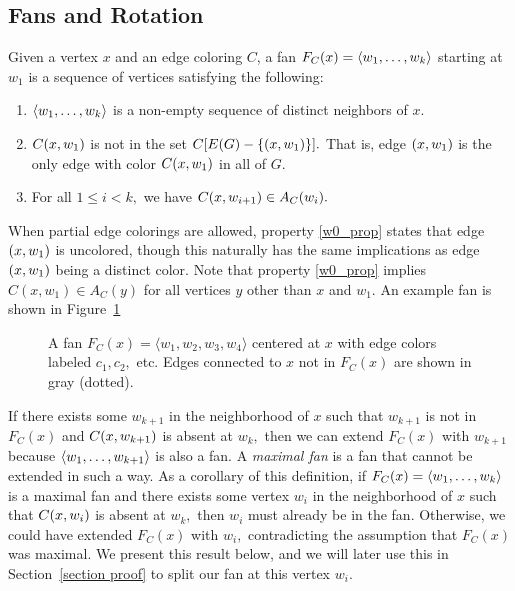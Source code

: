 \subsection{Fans and Rotation}
Given a vertex $x$ and an edge coloring $C$, a fan $F_{C}(x) = \langle w_1, \dots, w_k\rangle$ starting at $w_1$ is a sequence of vertices satisfying the following:
\begin{enumerate}
    \item \label{neigh_prop}$\langle w_1, \dots, w_k\rangle$ is a non-empty sequence of distinct neighbors of $x$.
    \item \label{w0_prop} $C(x, w_1)$ is not in the set $C[E(G) - \{(x, w_1)\}].$ That is, edge $(x, w_1)$ is the only edge with color $C(x, w_1)$ in all of $G$. 
    \item \label{abs_prop} For all $1 \leq i < k,$ we have $C(x, w_{i+1}) \in A_{C}(w_i).$
\end{enumerate}
When partial edge colorings are allowed, property \ref{w0_prop} states that edge $(x, w_1)$ is uncolored, though this naturally has the same implications as edge $(x, w_1)$ being a distinct color. Note that property \ref{w0_prop} implies $C(x,w_1) \in A_C(y)$ for all vertices $y$ other than $x$ and $w_1.$ An example fan is shown in Figure~\ref{fig:fan}
\begin{figure}
    \centering
    
    \caption{A fan $F_C(x)=\langle w_1, w_2, w_3, w_4\rangle$ centered at $x$ with edge colors labeled $c_1, c_2,$ etc. Edges connected to $x$ not in $F_C(x)$ are shown in gray (dotted).}
    \label{fig:fan}
\end{figure}

If there exists some $w_{k+1}$ in the neighborhood of $x$ such that $w_{k+1}$ is not in $F_C(x)$ and $C(x, w_{k+1})$ is absent at $w_k,$ then we can extend $F_C(x)$ with $w_{k+1}$ because $\langle w_1, \dots, w_{k+1}\rangle$ is also a fan. A \textit{maximal fan} is a fan that cannot be extended in such a way. As a corollary of this definition, if $F_C(x) = \langle w_1, \dots, w_k \rangle$ is a maximal fan and there exists some vertex $w_i$ in the neighborhood of $x$ such that $C(x, w_i)$ is absent at $w_k,$ then $w_i$ must already be in the fan. Otherwise, we could have extended $F_C(x)$ with $w_i,$ contradicting the assumption that $F_C(x)$ was maximal. We present this result below, and we will later use this in Section~\ref{section proof} to split our fan at this vertex $w_i.$

